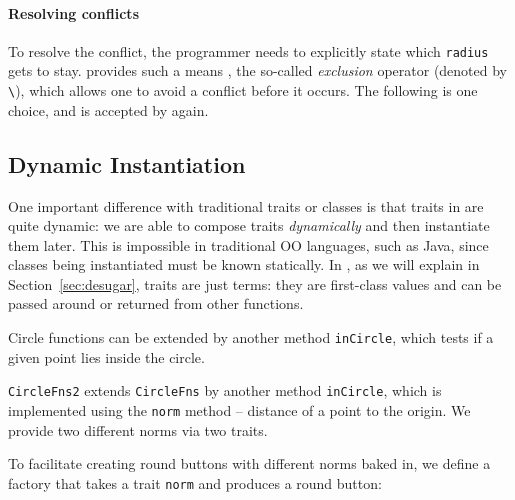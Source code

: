 \paragraph{Resolving conflicts}
To resolve the conflict, the programmer needs to explicitly state which
\lstinline{radius} gets to stay. \name provides such a means , the so-called
\textit{exclusion} operator (denoted by \lstinline{\}), which allows one to
avoid a conflict before it occurs. The following is one choice, and is accepted
by \name again.



\subsection{Dynamic Instantiation}

One important difference with traditional traits or classes is that traits in
\name are quite dynamic: we are able to compose traits \textit{dynamically} and
then instantiate them later. This is impossible in traditional OO languages, such
as Java, since classes being instantiated must be known statically. In \name, as
we will explain in Section~\ref{sec:desugar}, traits are just terms: they are
first-class values and can be passed around or returned from other functions.

Circle functions can be extended by another method \lstinline{inCircle},
which tests if a given point lies inside the circle.

\lstinline{CircleFns2} extends \lstinline{CircleFns} by another method
\lstinline{inCircle}, which is implemented using the \lstinline{norm} method --
distance of a point to the origin. We provide two different norms via two traits.


To facilitate creating round buttons with different norms baked in, we define a
factory that takes a trait \lstinline$norm$ and produces a round button:

